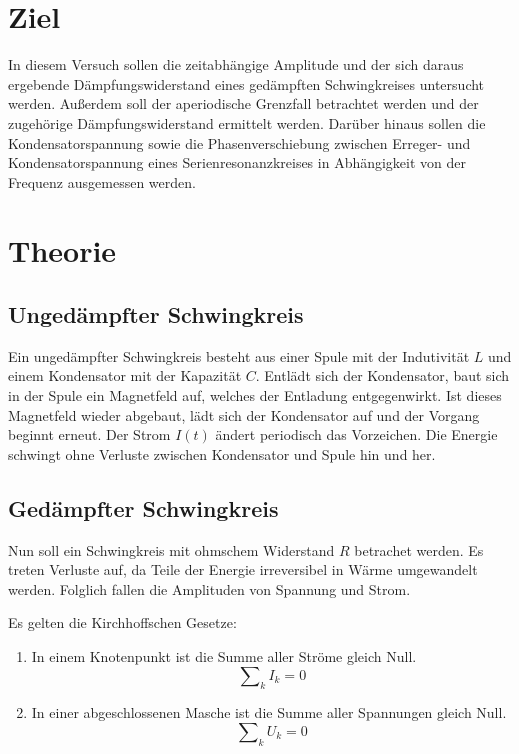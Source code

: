 \section{Ziel}
\label{sec:Ziel}
In diesem Versuch sollen die zeitabhängige Amplitude und der sich daraus ergebende Dämpfungswiderstand eines gedämpften Schwingkreises untersucht werden. Außerdem soll der aperiodische Grenzfall betrachtet werden und der zugehörige Dämpfungswiderstand ermittelt werden. Darüber hinaus sollen die Kondensatorspannung sowie die Phasenverschiebung zwischen Erreger- und Kondensatorspannung eines Serienresonanzkreises in Abhängigkeit von der Frequenz ausgemessen werden.

\section{Theorie}
\label{sec:theorie}
\subsection{Ungedämpfter Schwingkreis}
Ein ungedämpfter Schwingkreis besteht aus einer Spule mit der Indutivität $L$ und einem Kondensator mit der Kapazität $C$. Entlädt sich der Kondensator, baut sich in der Spule ein Magnetfeld auf, welches der Entladung entgegenwirkt. Ist dieses Magnetfeld wieder abgebaut, lädt sich der Kondensator auf und der Vorgang beginnt erneut. Der Strom $I(t)$ ändert periodisch das Vorzeichen. Die Energie schwingt ohne Verluste zwischen Kondensator und Spule hin und her.


\subsection{Gedämpfter Schwingkreis }
Nun soll ein Schwingkreis mit ohmschem Widerstand $R$ betrachet werden. Es treten Verluste auf, da Teile der Energie irreversibel in Wärme umgewandelt werden. Folglich fallen die Amplituden von Spannung und Strom.


Es gelten die Kirchhoffschen Gesetze:
\begin{enumerate}
  \item In einem Knotenpunkt ist die Summe aller Ströme gleich Null.
  \begin{equation}
    \mathrm\sum_{k} I_k = 0
  \end{equation}
  \item In einer abgeschlossenen Masche ist die Summe aller Spannungen gleich Null.
  \begin{equation}
    \mathrm\sum_{k} U_k = 0
  \end{equation}
\end{enumerate}

